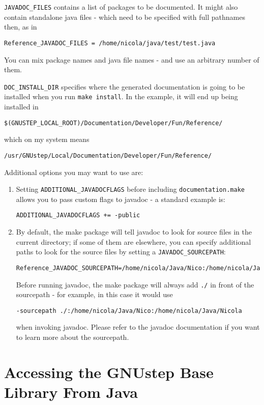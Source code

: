 \texttt{JAVADOC\_FILES} contains a list of packages to be documented.  
It might also contain standalone java files - which need to be
specified with full pathnames then, as in 
\begin{verbatim}
Reference_JAVADOC_FILES = /home/nicola/java/test/test.java
\end{verbatim}
You can mix package names and java file names - and use an arbitrary
number of them.

\texttt{DOC\_INSTALL\_DIR} specifies where the generated documentation 
is going to be installed when you run \texttt{make install}.  In the
example, it will end up being installed in 
\begin{verbatim}
$(GNUSTEP_LOCAL_ROOT)/Documentation/Developer/Fun/Reference/
\end{verbatim}%
which on my system means
\begin{verbatim}
/usr/GNUstep/Local/Documentation/Developer/Fun/Reference/
\end{verbatim}
Additional options you may want to use are: 
\begin{enumerate}
\item Setting \texttt{ADDITIONAL\_JAVADOCFLAGS} before including 
\texttt{documentation.make} allows you to pass custom 
flags to javadoc - a standard example is:
\begin{verbatim}
ADDITIONAL_JAVADOCFLAGS += -public
\end{verbatim}
\item By default, the make package will tell javadoc to look for source 
files in the current directory; if some of them are elsewhere, you can
specify additional paths to look for the source files by setting a
\texttt{JAVADOC\_SOURCEPATH}:
\begin{verbatim}
Reference_JAVADOC_SOURCEPATH=/home/nicola/Java/Nico:/home/nicola/Java/Nicola
\end{verbatim}
Before running javadoc, the make package will always add \texttt{./} in 
front of the sourcepath - for example, in this case it would use 
\begin{verbatim}
-sourcepath ./:/home/nicola/Java/Nico:/home/nicola/Java/Nicola
\end{verbatim}
when invoking javadoc.  Please refer to the javadoc documentation if
you want to learn more about the sourcepath.
\end{enumerate}

\section{Accessing the GNUstep Base Library From Java}

